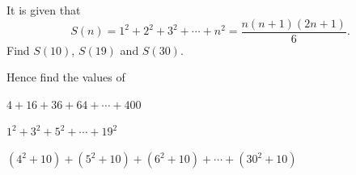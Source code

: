  It is given that
\[
S(n)=1^2+2^2+3^2+\cdots+n^2=\frac{n(n+1)(2n+1)}{6}.
\]
Find $S(10)$, $S(19)$ and $S(30)$.

\begin{subparts}{Hence find the values of}
  \item $4+16+36+64+\cdots+400$
  \item $1^2+3^2+5^2+\cdots+19^2$
  \item $(4^2+10)+(5^2+10)+(6^2+10)+\cdots+(30^2+10)$
\end{subparts}

